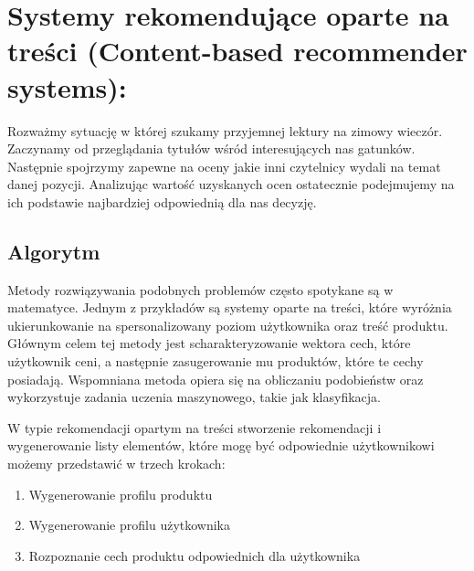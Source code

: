 \documentclass[12pt,a4paper]{report}
\begin{document}
\section{Systemy rekomendujące oparte na treści 
(Content-based recommender systems):}
Rozważmy sytuację w której szukamy przyjemnej lektury na zimowy wieczór. Zaczynamy od przeglądania tytułów wśród interesujących nas gatunków. Następnie spojrzymy zapewne na oceny jakie inni czytelnicy wydali na temat danej pozycji. Analizując wartość uzyskanych ocen ostatecznie podejmujemy na ich podstawie najbardziej odpowiednią dla nas decyzję. 



\subsection{Algorytm}
Metody rozwiązywania podobnych problemów często spotykane są w matematyce. Jednym z przykładów są systemy oparte na treści, które wyróżnia ukierunkowanie na spersonalizowany poziom użytkownika oraz treść produktu. Głównym celem tej metody jest scharakteryzowanie wektora cech, które użytkownik ceni, a następnie zasugerowanie mu produktów, które te cechy posiadają. Wspomniana metoda opiera się na obliczaniu podobieństw oraz wykorzystuje zadania uczenia maszynowego, takie jak klasyfikacja.


W typie rekomendacji opartym na treści stworzenie rekomendacji i wygenerowanie listy elementów, które mogę być odpowiednie użytkownikowi możemy przedstawić w trzech krokach:
\begin{enumerate}
\item{Wygenerowanie profilu produktu}
\item{Wygenerowanie profilu użytkownika}
\item{Rozpoznanie cech produktu odpowiednich dla użytkownika}
\end{enumerate}
\end{document}
